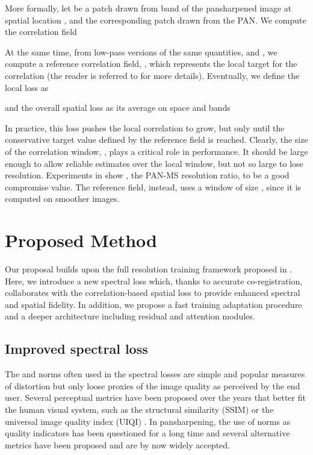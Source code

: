 \documentclass[journal]{IEEEtran}
\begin{document}
More formally, let
 be a  patch drawn from band  of the pansharpened image at spatial location , and
 the corresponding patch drawn from the PAN.
We compute the correlation field

At the same time, from low-pass versions of the same quantities,  and ,
we compute a reference correlation field, , which represents the local target for the correlation (the reader is referred to \cite{Ciotola2022} for more details).
Eventually, we define the local loss as

and the overall spatial loss as its average on space and bands


In practice, this loss pushes the local correlation to grow, but only until the conservative target value defined by the reference field is reached.
Clearly, the size of the correlation window, , plays a critical role in performance.
It should be large enough to allow reliable estimates over the local window, but not so large to lose resolution.
Experiments in \cite{Ciotola2022} show , the PAN-MS resolution ratio, to be a good compromise value.
The reference field, instead, uses a window of size , since it is computed on smoother images.


\section{Proposed Method}
\label{sec:proposed}

Our proposal builds upon the full resolution training framework proposed in \cite{Ciotola2022}.
Here, we introduce a new spectral loss which, thanks to accurate co-registration,
collaborates with the correlation-based spatial loss to provide enhanced spectral and spatial fidelity.
In addition, we propose a fast training adaptation procedure and a deeper architecture including residual and attention modules.

\subsection{Improved spectral loss}

The  and  norms often used in the spectral losses are simple and popular measures of distortion
but only loose proxies of the image quality as perceived by the end user.
Several perceptual metrics have been proposed over the years that better fit the human visual system,
such as the structural similarity (SSIM) \cite{Wang2004} or the universal image quality index (UIQI) \cite{Wang2002}.
In pansharpening, the use of  norms as quality indicators has been questioned for a long time
and several alternative metrics have been proposed and are by now widely accepted.
\end{document}
